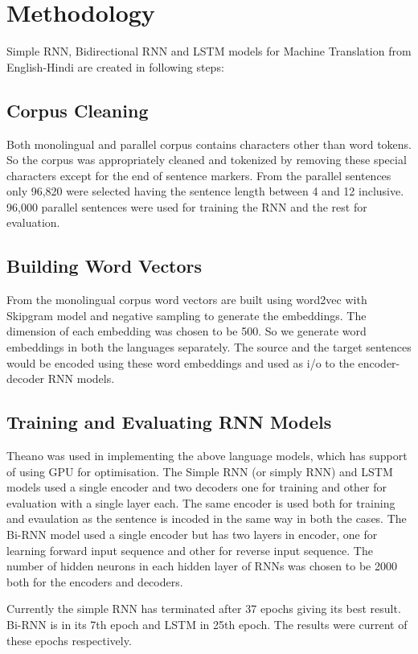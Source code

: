 \documentclass[12pt]{report}
\begin{document}
\chapter{Methodology}

Simple RNN, Bidirectional RNN and LSTM models for Machine Translation from English-Hindi are created in following steps: 

\section{Corpus Cleaning}
Both monolingual and parallel corpus contains characters other than word tokens. So the corpus was appropriately cleaned and tokenized by removing these special characters except for the end of sentence markers. From the parallel sentences only 96,820 were selected having the sentence length between 4 and 12 inclusive.
96,000 parallel sentences were used for training the RNN and the rest for evaluation. 

\section{Building Word Vectors}
From the monolingual corpus word vectors are built using \cite{word2vec1} word2vec with Skipgram model and negative sampling to generate the embeddings. The dimension of each embedding was chosen to be 500. So we generate word embeddings in both the languages separately. The source and the target sentences would be encoded using these word embeddings and used as i/o to the encoder-decoder RNN models.

\section{Training and Evaluating RNN Models}
Theano was used in implementing the above language models, which has support of using GPU for optimisation. The Simple RNN (or simply RNN) and LSTM models used a single encoder and two decoders one for training and other for evaluation with a single layer each. The same encoder is used both for training and evaulation as the sentence is incoded in the same way in both the cases. The Bi-RNN model used a single encoder but has two layers in encoder, one for learning forward input sequence and other for reverse input sequence.
The number of hidden neurons in each hidden layer of RNNs was chosen to be 2000 both for the encoders and decoders.

Currently the simple RNN has terminated after 37 epochs giving its best result. Bi-RNN is in its 7th epoch and LSTM in 25th epoch. The results were current of these epochs respectively.
\end{document}
